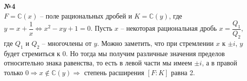 \documentclass[a4paper, 12pt]{article}
\begin{document}
	\textbf{№4} \\

	$F = \mathbb C(x)$ -- поле рациональных дробей и $K = \mathbb C(y)$, где $y = x+\dfrac{1}{x} \Leftrightarrow x^2-xy+1=0$. Пусть $x$ -- некоторая рациональная дробь $x = \dfrac{Q_1}{Q_2}$, где $Q_1$ и $Q_2$ -- многочлены от $y$. Можно заметить, что при стремлении $x$ к $\pm i$, $y$ будет стремиться к $0$. Но тогда мы получим различные значения пределов относительно знака равенства, то есть в левой части мы имеем $\pm i$, а в правой только $0 \Rightarrow x \notin \mathbb C(y) \Rightarrow$ степень расширения $[F:K]$ равна 2. \\
\end{document}
